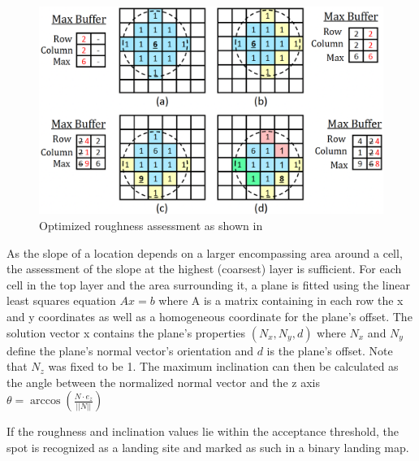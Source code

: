 \begin{figure}[ht!]
    \centering
    \includegraphics[scale=0.5]{images/system_overview/roughness_check.png}
    \caption{Optimized roughness assessment as shown in \citet{LSD2}}
    \label{fig:lsd_roughness_check}
\end{figure}

As the slope of a location depends on a larger encompassing area around a cell, the assessment of the slope at the highest (coarsest) layer is sufficient. For each cell in the top layer and the area surrounding it, a plane is fitted using the linear least squares equation $Ax = b$ where A is a matrix containing in each row the x and y coordinates as well as a homogeneous coordinate for the plane's offset. The solution vector x contains the plane's properties $\left(N_x, N_y, d\right)$ where $N_x$ and $N_y$ define the plane's normal vector's orientation and $d$ is the plane's offset. Note that $N_z$ was fixed to be 1. The maximum inclination can then be calculated as the angle between the normalized normal vector and the z axis $\theta = \arccos\left(\frac{N \cdot e_z}{||N||}\right)$

If the roughness and inclination values lie within the acceptance threshold, the spot is recognized as a landing site and marked as such in a binary landing map. 

